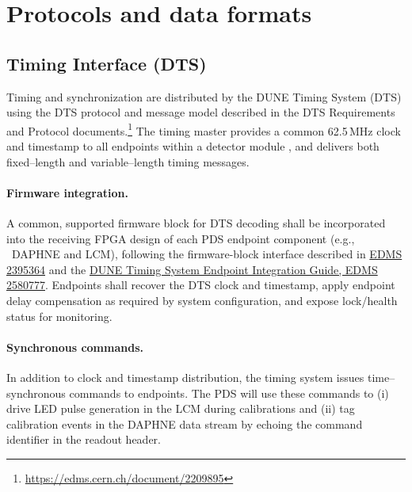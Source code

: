 \section{Protocols and data formats}

\subsection{Timing Interface (DTS)}
\label{sec:protocol-timing}

Timing and synchronization are distributed by the DUNE Timing System (DTS) using the DTS protocol and message model described in the DTS Requirements and Protocol documents.\footnote{\url{https://edms.cern.ch/document/2209895}} The timing master provides a common 62.5\,MHz clock and timestamp to all endpoints within a detector module , and delivers both fixed--length and variable--length timing messages.

\paragraph{Firmware integration.}

A common, supported firmware block for DTS decoding shall be incorporated into the receiving FPGA design of each PDS endpoint component (e.g., \ DAPHNE and LCM), following the firmware-block interface described in \href{https://edms.cern.ch/document/2395364}{EDMS 2395364} and the \href{https://edms.cern.ch/document/2580777}{DUNE Timing System Endpoint Integration Guide, EDMS 2580777}. Endpoints shall recover the DTS clock and timestamp, apply endpoint delay compensation as required by system configuration, and expose lock/health status for monitoring.


\paragraph{Synchronous commands.}
In addition to clock and timestamp distribution, the timing system issues time--synchronous commands to endpoints. The PDS will use these commands to (i) drive LED pulse generation in the LCM during calibrations and (ii) tag calibration events in the DAPHNE data stream by echoing the command identifier in the readout header.

